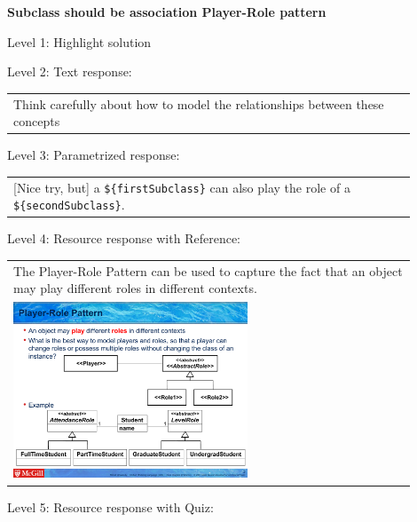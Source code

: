 \noindent \textbf{Subclass should be association Player-Role pattern} \medskip

\noindent Level 1: Highlight solution \medskip

\noindent Level 2: Text response: \medskip

\begin{tabular}{|p{0.9\linewidth}}
Think carefully about how to model the relationships between these concepts
\end{tabular} \medskip

\noindent Level 3: Parametrized response: \medskip

\begin{tabular}{|p{0.9\linewidth}}
[Nice try, but] a \verb|${firstSubclass}| can also play the role of a \verb|${secondSubclass}|.
\end{tabular} \medskip

\noindent Level 4: Resource response with Reference: \medskip

\begin{tabular}{|p{0.9\linewidth}}
The Player-Role Pattern can be used to capture the fact that an object may play different roles
in different contexts.

\\
\includegraphics[width=0.6\textwidth]{images/player_role.png}
\end{tabular} \medskip

\noindent Level 5: Resource response with Quiz: \medskip


